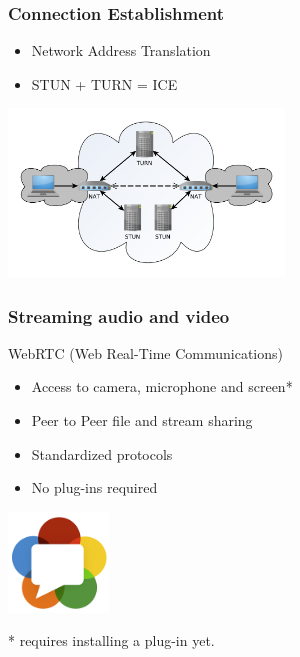 \documentclass[compress]{beamer}
\begin{document}
  		\begin{frame}[c]
		\frametitle{Connection Establishment}
		\begin{itemize}
		\item Network Address Translation	
		\vfill
		\item STUN + TURN = ICE
		\end{itemize}
		\begin{flushright}

			\vspace*{-4\baselineskip}
			\includegraphics[width=0.55\textwidth]{figures/ice.pdf}
		\end{flushright}
		
		\end{frame}

		\begin{frame}[c]
		\frametitle{Streaming audio and video}

		WebRTC (Web Real-Time Communications)

		\begin{itemize}
		\item Access to camera, microphone and screen*
		\item Peer to Peer file and stream sharing
		\item Standardized protocols
		\item No plug-ins required
		\end{itemize}

		\begin{flushright}

			\vspace*{-5\baselineskip}
			\includegraphics[width=0.2\textwidth]{figures/webrtc.png}
		\end{flushright}
		
			\tiny{* requires installing a plug-in yet.}

		\end{frame}
\end{document}
